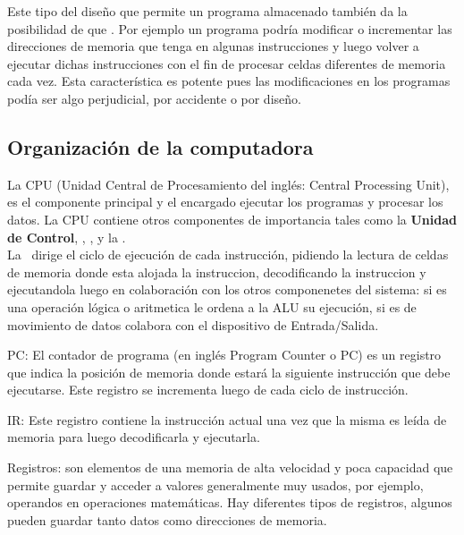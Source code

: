 Este tipo del diseño que permite un programa almacenado también da la posibilidad de que . Por ejemplo un programa podría modificar o incrementar  las direcciones de memoria que tenga en algunas instrucciones y luego volver a ejecutar dichas instrucciones con el fin de procesar celdas diferentes de memoria cada vez. Esta característica es potente  pues las modificaciones en los programas podía ser algo perjudicial, por accidente o por diseño.

\subsection{Organización de la computadora}

La CPU (Unidad Central de Procesamiento del inglés: Central Processing Unit), es el componente principal y el encargado ejecutar los programas y procesar los datos. La CPU contiene otros componentes de importancia tales como la \textbf{Unidad de Control}, , ,  y la .\\

La \UC\ dirige el ciclo de ejecución de cada instrucción, pidiendo la lectura de celdas de memoria donde esta alojada la instruccion, decodificando la instruccion y ejecutandola luego en colaboración con los otros componenetes del sistema: si es una operación lógica o aritmetica le ordena a la ALU su ejecución, si es de movimiento de datos colabora con el dispositivo de Entrada/Salida.

PC: El contador de programa (en inglés Program Counter o PC) es un registro que indica la posición de memoria donde estará la siguiente instrucción que debe ejecutarse. Este registro se incrementa luego de cada ciclo de instrucción.

IR: Este registro contiene la instrucción actual una vez que la misma es leída de memoria para luego decodificarla y ejecutarla.

Registros: son elementos de una memoria de alta velocidad y poca capacidad que permite guardar y acceder a valores generalmente muy usados, por ejemplo, operandos en operaciones matemáticas. Hay diferentes tipos de registros, algunos pueden guardar tanto datos como direcciones de memoria.

